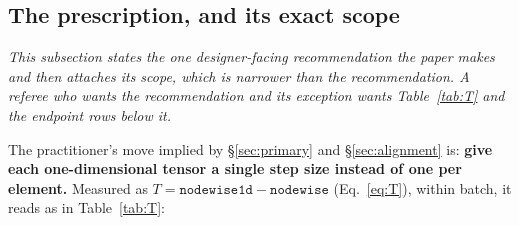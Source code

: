 \documentclass[10pt,letterpaper]{article}
\newcommand{\Tstat}{T}                         %
\newcommand{\arm}[1]{\texttt{#1}}
\begin{document}
\subsection{The prescription, and its exact scope}
\label{sec:prescription}

\emph{This subsection states the one designer-facing recommendation the paper makes and then
attaches its scope, which is narrower than the recommendation. A referee who wants the
recommendation and its exception wants Table~\ref{tab:T} and the endpoint rows below it.}

The practitioner's move implied by \S\ref{sec:primary} and \S\ref{sec:alignment} is: \textbf{give
each one-dimensional tensor a single step size instead of one per element.} Measured as
$\Tstat = \arm{nodewise1d} - \arm{nodewise}$ (Eq.~\ref{eq:T}), within batch, it reads as in
Table~\ref{tab:T}:
\end{document}
